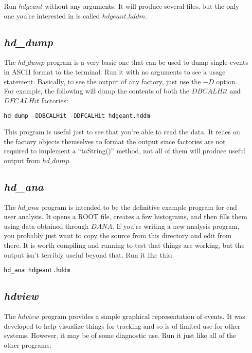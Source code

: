 \documentclass[12pt]{article}
\begin{document}
Run $hdgeant$ without any arguments. It will produce several files,
but the only one you're interested in is called $hdgeant.hddm$.

\subsection{{\it hd\_dump}}
The $hd\_dump$ program is a very basic one that can be used to dump
single events in ASCII format to the terminal. Run it with no arguments
to see a usage statement. Basically, to see the output of any factory,
just use the $-D$ option. For example, the following will dump the contents
of both the $DBCALHit$ and $DFCALHit$ factories:

\begin{lstlisting}[frame=shadowbox,backgroundcolor=\color{cmdbkgd}]
hd_dump -DDBCALHit -DDFCALHit hdgeant.hddm
\end{lstlisting}

This program is useful just to see that you're able to read the
data. It relies on the factory objects themselves to format the
output since factories are not required to implement a
``toString()'' method, not all of them will produce useful output
from $hd\_dump$.

\subsection{{\it hd\_ana}}
The $hd\_ana$ program is intended to be the definitive example
program for end user analysis. It opens a ROOT file, creates a
few histograms, and then fills them using data obtained through
$DANA$. If you're writing a new analysis program, you probably just
want to copy the source from this directory and edit from there.
It is worth compiling and running to test that things are working,
but the output isn't terribly useful beyond that. Run it like this:

\begin{lstlisting}[frame=shadowbox,backgroundcolor=\color{cmdbkgd}]
hd_ana hdgeant.hddm
\end{lstlisting}

\subsection{{\it hdview}}
The $hdview$ program provides a simple graphical representation
of events. It was developed to help visualize things for tracking
and so is of limited use for other systems. However, it may be
of some diagnostic use. Run it just like all of the other programs:
\end{document}
